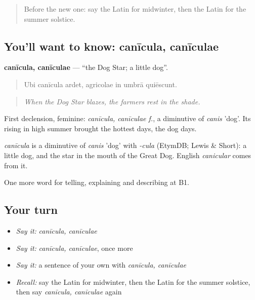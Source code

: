 \label{lesson:LA-C488-canicula}



\begin{quote}
Before the new one: say the Latin for midwinter, then the Latin for the summer solstice.
\end{quote}

\subsection*{You'll want to know: canīcula, canīculae}
\textbf{canīcula, canīculae} — \textquotedblleft{}the Dog Star; a little dog\textquotedblright{}.

\begin{quote}
Ubi canīcula ardet, agricolae in umbrā quiēscunt.
\end{quote}

\begin{quote}
\emph{When the Dog Star blazes, the farmers rest in the shade.}
\end{quote}

First declension, feminine: \emph{canīcula, canīculae f.}, a diminutive of \emph{canis} 'dog'. Its rising in high summer brought the hottest days, the dog days.

\begin{cousinweb}
\emph{canīcula} is a diminutive of \emph{canis} 'dog' with \emph{-cula} (EtymDB; Lewis \& Short): a little dog, and the star in the mouth of the Great Dog. English \emph{canicular} comes from it.
\end{cousinweb}

\begin{grammarlens}[title={What you've built}]
One more word for telling, explaining and describing at B1.
\end{grammarlens}

\subsection*{Your turn}
\begin{itemize}
\raggedright
  \item \emph{Say it:} \emph{canīcula, canīculae}
  \item \emph{Say it:} \emph{canīcula, canīculae}, once more
  \item \emph{Say it:} a sentence of your own with \emph{canīcula, canīculae}
  \item \emph{Recall:} say the Latin for midwinter, then the Latin for the summer solstice, then say \emph{canīcula, canīculae} again
\end{itemize}

